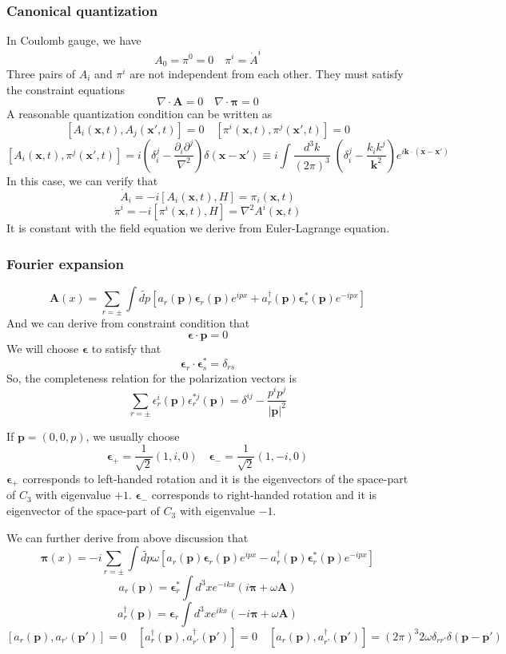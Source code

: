 \subsubsection{Canonical quantization}
\noindent
In Coulomb gauge, we have
\[A_0 = \pi^0 = 0 \quad \pi^i = \dot{A}^i \]
Three pairs of $A_i$ and $\pi^i$ are not independent from each other. They must satisfy the constraint equations
\[\nabla \cdot \bm{A} = 0 \quad \nabla \cdot \bm{\pi} = 0\]
A reasonable quantization condition can be written as
\[[A_i(\bm{x},t),A_j(\bm{x}',t)] = 0 \quad [\pi^i(\bm{x},t),\pi^j(\bm{x}',t)] = 0\]
\[[A_i(\bm{x},t),\pi^j(\bm{x}',t)] = i \left( \delta^{j}_i - \frac{\partial_i \partial^j}{\nabla^2} \right) \delta(\bm{x}-\bm{x}') \equiv i \int \frac{d^3k}{(2\pi)^3} \; (\delta^j_i - \frac{k_ik^j}{\bm{k}^2})e^{i\bm{k}\cdot(\bm{x}-\bm{x}')}\]
In this case, we can verify that
\[\dot{A}_i = -i[A_i(\bm{x},t),H] = \pi_i (\bm{x},t)\]
\[\dot{\pi}^i = -i[\pi^i(\bm{x},t),H] = \nabla^2 A^i(\bm{x},t)\]
It is constant with the field equation we derive from Euler-Lagrange equation.

\subsubsection{Fourier expansion}
\[\bm{A}(x) = \sum_{r = \pm} \int \widetilde{dp} [a_{r}(\bm{p}) \bm{\epsilon}_r(\bm{p})e^{ipx} + a^{\dagger}_{r}(\bm{p}) \bm{\epsilon}^*_r(\bm{p})e^{-ipx}]\]
And we can derive from constraint condition that
\[\bm{\epsilon} \cdot \bm{p} = 0\]
We will choose $\bm{\epsilon}$ to satisfy that
\[\bm{\epsilon}_r \cdot \bm{\epsilon}^*_s = \delta_{rs}\]
So, the completeness relation for the polarization vectors is
\[\sum_{r=\pm} \epsilon_r^i(\bm{p}) \epsilon_r^{*j}(\bm{p}) = \delta^{ij} - \frac{p^ip^j}{|\bm{p}|^2}\]
\begin{example}
If $\bm{p} = (0,0,p)$, we usually choose 
\[\bm{\epsilon}_{+} = \frac{1}{\sqrt{2}}(1,i,0) \quad \bm{\epsilon}_{-} = \frac{1}{\sqrt{2}}(1,-i,0) \]
$\bm{\epsilon}_{+}$ corresponds to left-handed rotation and it is the eigenvectors of the space-part of $C_3$ with eigenvalue $+1$. $\bm{\epsilon}_{-}$ corresponds to right-handed rotation and it is eigenvector of the space-part of $C_3$ with eigenvalue $- 1$.
\end{example}
\noindent
We can further derive from above discussion that
\[\bm{\pi}(x) = -i \sum_{r = \pm} \int \widetilde{dp} \omega [a_{r}(\bm{p}) \bm{\epsilon}_r(\bm{p})e^{ipx} - a^{\dagger}_{r}(\bm{p}) \bm{\epsilon}^*_r(\bm{p})e^{-ipx}]\]
\[a_r(\bm{p}) = \bm{\epsilon}^*_r \int d^3x e^{-ikx}(i\bm{\pi}+\omega\bm{A})\]
\[a^{\dagger}_r(\bm{p}) = \bm{\epsilon}_r \int d^3x e^{ikx}(-i\bm{\pi}+\omega\bm{A})\]
\[[a_r(\bm{p}),a_{r'}(\bm{p'})] = 0 \quad [a^{\dagger}_r(\bm{p}),a^{\dagger}_{r'}(\bm{p'})] = 0 \quad [a_r(\bm{p}),a^{\dagger}_{r'}(\bm{p'})] = (2\pi)^3 2\omega \delta_{rr'} \delta(\bm{p} - \bm{p}')\]

